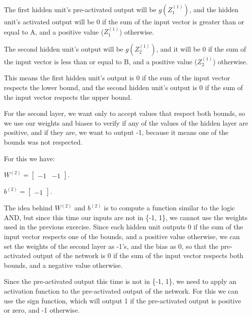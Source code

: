 \documentclass{article}
\begin{document}
\bigskip

The first hidden unit's pre-activated output will be $g(Z_1^{(1)})$, and the hidden unit's activated output 
will be 0 if the sum of the input vector is greater than or equal to A, and a positive value ($Z_1^{(1)}$) otherwise.

The second hidden unit's output will be $g(Z_2^{(1)})$, and it will be 0 if the sum of the input vector is less than or equal to B, 
and a positive value ($Z_2^{(1)}$) otherwise.

This means the first hidden unit's output is 0 if the sum of the input vector respects the lower bound, 
and the second hidden unit's output is 0 if the sum of the input vector respects the upper bound.

\bigskip

For the second layer, we want only to accept values that respect both bounds, so we use our weights and biases to verify if any of the values
of the hidden layer are positive, and if they are, we want to output -1, because it means one of the bounds was not respected.

\bigskip

For this we have:

\bigskip

\( W^{(2)} = \begin{bmatrix}
    -1 & -1
\end{bmatrix}
\).

\bigskip

\(b^{(2)} = \begin{bmatrix}
    -1
\end{bmatrix}
\).

\bigskip

The idea behind \(W^{(2)}\) and \(b^{(2)}\) is to compute a function similar to the logic AND, but since this time our inputs are not in 
\{-1, 1\}, we cannot use the weights used in the previous exercise.
Since each hidden unit outputs 0 if the sum of the input vector respects one of the bounds, and a positive value otherwise, we can set the 
weights of the second layer as -1's, and the bias as 0, so that the pre-activated output of the network is 0 if the sum of the input vector 
respects both bounds, and a negative value otherwise.

\bigskip

Since the pre-activated output this time is not in \{-1, 1\}, we need to apply an activation function to the pre-activated output of the network. 
For this we can use the sign function, which will output 1 if the pre-activated output is positive or zero, and -1 otherwise.
\end{document}
